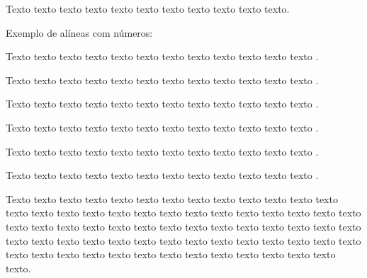     Texto texto texto texto texto texto texto texto texto texto texto.



    Exemplo de alíneas com números:

    \begin{alineascomnumero}
	    \item Texto texto texto texto texto texto texto texto texto texto texto texto .
	    \item Texto texto texto texto texto texto texto texto texto texto texto texto .
	    \item Texto texto texto texto texto texto texto texto texto texto texto texto .
	    \item Texto texto texto texto texto texto texto texto texto texto texto texto .
	    \item Texto texto texto texto texto texto texto texto texto texto texto texto .
	    \item Texto texto texto texto texto texto texto texto texto texto texto texto .
    \end{alineascomnumero}

    Texto texto texto texto texto texto texto texto texto texto texto texto texto texto texto texto texto texto texto texto texto texto texto texto texto texto texto texto texto texto texto texto texto texto texto texto texto texto texto texto texto texto texto texto texto texto texto texto texto texto texto texto texto texto texto texto texto texto texto texto texto texto texto texto texto texto texto texto texto.

